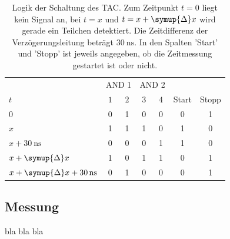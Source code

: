  \begin{table}
    \centering
    \caption{Logik der Schaltung des TAC. Zum Zeitpunkt $t=0$ liegt kein Signal an, bei $t=x$ und $t=x+\symup{\Delta}x$ wird gerade ein Teilchen detektiert. %
    Die Zeitdifferenz der Verzögerungsleitung beträgt $\qty{30}{\nano\second}$. In den Spalten 'Start' und 'Stopp' ist jeweils angegeben, ob die Zeitmessung %
    gestartet ist oder nicht.}
    \label{tab:Logik}
    \begin{tabular}{l | c c | c c | c c}
      \toprule
      {} & \multicolumn{2}{c|}{AND 1} & \multicolumn{2}{c|}{AND 2} & {} & {} \\
      $t$ & $1$ & $2$ & $3$ & $4$ & Start & Stopp \\
      \midrule
      $0$                                               & 0 & 1 & 0 & 0 & 0 & 1 \\
      $x$                                               & 1 & 1 & 1 & 0 & 1 & 0 \\
      {$x + \qty{30}{\nano\second}$}                    & 0 & 0 & 0 & 1 & 1 & 0 \\
      {$x + \symup{\Delta}x$}                           & 1 & 0 & 1 & 1 & 0 & 1 \\
      {$x + \symup{\Delta}x + \qty{30}{\nano\second}$}  & 0 & 1 & 0 & 0 & 0 & 1 \\      
      
      \bottomrule
    \end{tabular}
  \end{table}

  \subsection{Messung}
  \label{subsec:Messung}
  bla bla bla
